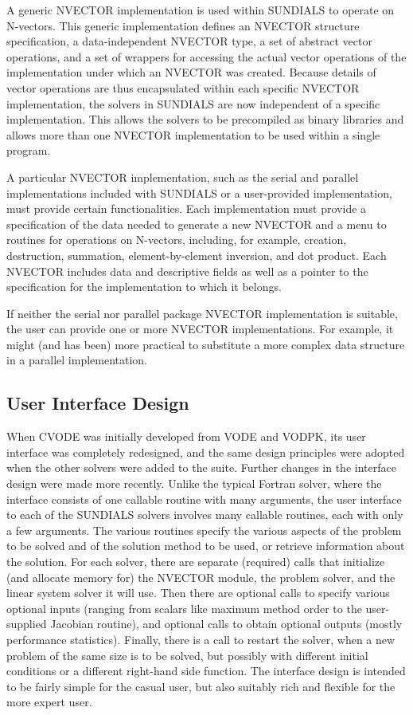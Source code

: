 A generic NVECTOR implementation is used within SUNDIALS to
operate on N-vectors. This generic implementation defines an NVECTOR
structure specification, a data-independent NVECTOR type, a set of abstract
vector operations, and a set of wrappers for accessing the actual vector
operations of the implementation under which an NVECTOR was created. Because
details of vector operations are thus encapsulated within each specific
NVECTOR implementation, the solvers in SUNDIALS
are now independent of a specific
implementation. This allows the solvers to be precompiled as binary
libraries and allows more than one NVECTOR implementation to be used within
a single program.

A particular NVECTOR implementation, such as the serial and parallel
implementations included with SUNDIALS or a user-provided implementation,
must provide certain functionalities. Each implementation must provide a
specification of the data needed to generate a new NVECTOR and a menu to
routines for operations on N-vectors, including, for example, creation,
destruction, summation, element-by-element inversion, and dot product. Each
NVECTOR includes data and descriptive fields as well as a pointer to the
specification for the implementation to which it belongs.

If neither the serial nor parallel package NVECTOR implementation is
suitable, the user can provide one or more NVECTOR implementations.  For
example, it might (and has been) more practical to substitute a more complex
data structure in a parallel implementation.

\subsection{User Interface Design}

When CVODE was initially developed from VODE and VODPK, its user
interface was completely redesigned, and the same design principles
were adopted when the other solvers were added to the suite.  Further
changes in the interface design were made more recently.  Unlike the
typical Fortran solver, where the interface consists of one callable
routine with many arguments, the user interface to each of the
SUNDIALS solvers involves many callable routines, each with only a few
arguments.  The various routines specify the various aspects of the
problem to be solved and of the solution method to be used, or
retrieve information about the solution.  For each solver, there are
separate (required) calls that initialize (and allocate memory for)
the NVECTOR module, the problem solver, and the linear system solver
it will use.  Then there are optional calls to specify various
optional inputs (ranging from scalars like maximum method order to the
user-supplied Jacobian routine), and optional calls to obtain optional
outputs (mostly performance statistics).  Finally, there is a call to
restart the solver, when a new problem of the same size is to be
solved, but possibly with different initial conditions or a different
right-hand side function.  The interface design is intended to be
fairly simple for the casual user, but also suitably rich and flexible
for the more expert user.
